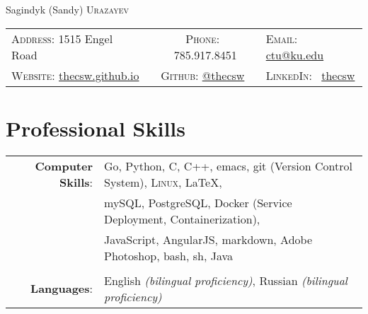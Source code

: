 \documentclass[letterpaper,10pt]{article}
\begin{document}
\pagestyle{empty} %

\par{\centering
		{\Huge Sagindyk (Sandy) \textsc{Urazayev}
	}\smallskip\par}

      \begin{center}
        \begin{tabular}{lcl}
          \textsc{Address:}   1515 Engel Road &
          \textsc{Phone:} \quad \ 785.917.8451 &
          \textsc{Email:} \quad \href{mailto:ctu@ku.edu}{ctu@ku.edu} \\

          \textsc{Website:} \href{https://thecsw.github.io}{thecsw.github.io}&
          \textsc{Github:} \quad \href{https://github.com/thecsw}{@thecsw}&
          \textsc{LinkedIn:} \ \href{https://linkedin.com/in/thecsw}{thecsw}\\
        \end{tabular}
      \end{center}
      
\section{Professional Skills}
\begin{tabular}{rl}

  \textbf{Computer Skills}:& Go, Python, C, C++, emacs, git (Version Control System), \textsc{Linux}, \LaTeX, \\& mySQL,
  PostgreSQL, Docker (Service Deployment, Containerization),\\&
  JavaScript, AngularJS, markdown, Adobe Photoshop, bash, sh, Java\\\\

  \textbf{Languages}: &English \emph{(bilingual proficiency)}, Russian \emph{(bilingual proficiency)}\\
  
\end{tabular}

\end{document}
